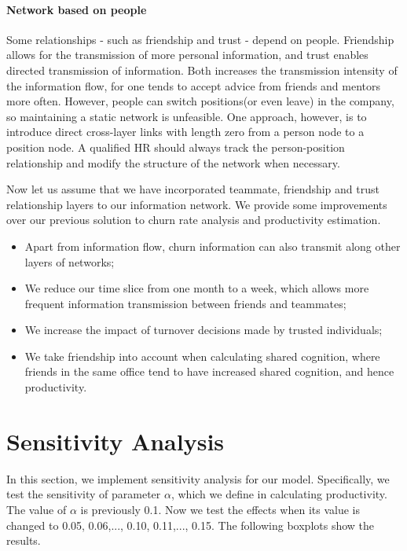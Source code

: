\documentclass[tcn = 37075, sheet = false, abstract = false]{mcmthesis}
\begin{document}
\paragraph{Network based on people} Some relationships - such as friendship and trust - depend on people. Friendship allows for the transmission of more personal information, and trust enables directed transmission of information. Both increases the transmission intensity of the information flow, for one tends to accept advice from friends and mentors more often. However, people can switch positions(or even leave) in the company, so maintaining a static network is unfeasible. One approach, however, is to introduce direct cross-layer links with length zero from a person node to a position node. A qualified HR should always track the person-position relationship and modify the structure of the network when necessary.

Now let us assume that we have incorporated teammate, friendship and trust relationship layers to our information network. We provide some improvements over our previous solution to churn rate analysis and productivity estimation.
\begin{itemize}
\item Apart from information flow, churn information can also transmit along other layers of networks;
\item We reduce our time slice from one month to a week, which allows more frequent information transmission between friends and teammates;
\item We increase the impact of turnover decisions made by trusted individuals;
\item We take friendship into account when calculating shared cognition, where friends in the same office tend to have increased shared cognition, and hence productivity.

\end{itemize}
\section{Sensitivity Analysis}

In this section, we implement sensitivity analysis for our model. Specifically, we test the sensitivity of parameter $\alpha$, which we define in calculating productivity. The value of $\alpha$ is previously 0.1. Now we test the effects when its value is changed to 0.05, 0.06,..., 0.10, 0.11,..., 0.15. The following boxplots show the results. 
\end{document}
